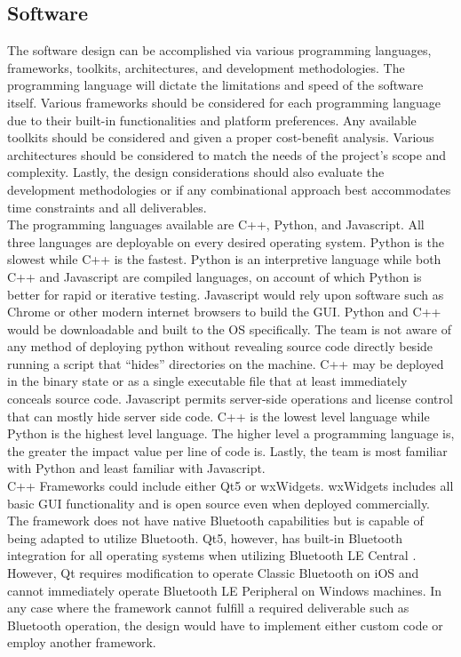 \documentclass[12pt]{article}
\begin{document}
\subsection{Software}
\indent \indent
The software design can be accomplished via various programming languages, frameworks, toolkits, architectures, and development methodologies.  The programming language will dictate the limitations and speed of the software itself.  Various frameworks should be considered for each programming language due to their built-in functionalities and platform preferences.  Any available toolkits should be considered and given a proper cost-benefit analysis.  Various architectures should be considered to match the needs of the project’s scope and complexity.  Lastly, the design considerations should also evaluate the development methodologies or if any combinational approach best accommodates time constraints and all deliverables.\\

\indent
The programming languages available are C++, Python, and Javascript.  All three languages are deployable on every desired operating system.  Python is the slowest while C++ is the fastest.  Python is an interpretive language while both C++ and Javascript are compiled languages, on account of which Python is better for rapid or iterative testing.  Javascript would rely upon software such as Chrome or other modern internet browsers to build the GUI.  Python and C++ would be downloadable and built to the OS specifically.  The team is not aware of any method of deploying python without revealing source code directly beside running a script that “hides” directories on the machine.  C++ may be deployed in the binary state or as a single executable file that at least immediately conceals source code.  Javascript permits server-side operations and license control that can mostly hide server side code.  C++ is the lowest level language while Python is the highest level language.  The higher level a programming language is, the greater the impact value per line of code is.  Lastly, the team is most familiar with Python and least familiar with Javascript.\\

\indent
C++ Frameworks could include either Qt5 or wxWidgets.  wxWidgets includes all basic GUI functionality and is open source even when deployed commercially.  The framework does not have native Bluetooth capabilities but is capable of being adapted to utilize Bluetooth.  Qt5, however, has built-in Bluetooth integration for all operating systems when utilizing Bluetooth LE Central \cite{qtbt} .  However, Qt requires modification to operate Classic Bluetooth on iOS and cannot immediately operate Bluetooth LE Peripheral on Windows machines.  In any case where the framework cannot fulfill a required deliverable such as Bluetooth operation, the design would have to implement either custom code or employ another framework.\\
\end{document}
